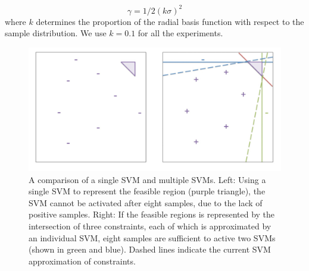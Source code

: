 \begin{equation}
  \gamma = 1/2(k\sigma)^2
\end{equation}
where $k$ determines the proportion of the radial basis
function with respect to the sample distribution. We use
$k = 0.1$ for all the experiments.

\begin{figure}[tb]
  \center
  \includegraphics[width=0.75\linewidth]{images/cmacwork2}
  \caption{
    A comparison of a single SVM and multiple SVMs. Left:
    Using a single SVM to represent the feasible region (purple
    triangle), the SVM cannot be activated after eight samples, due
    to the lack of positive samples. Right: If the feasible regions
    is represented by the intersection of three constraints, each of
    which is approximated by an individual SVM, eight samples are
    sufficient to active two SVMs (shown
    in green and blue). Dashed lines indicate the current SVM
    approximation of constraints.
  }
  \label{fig:parkour_cmacwork}
\end{figure}





